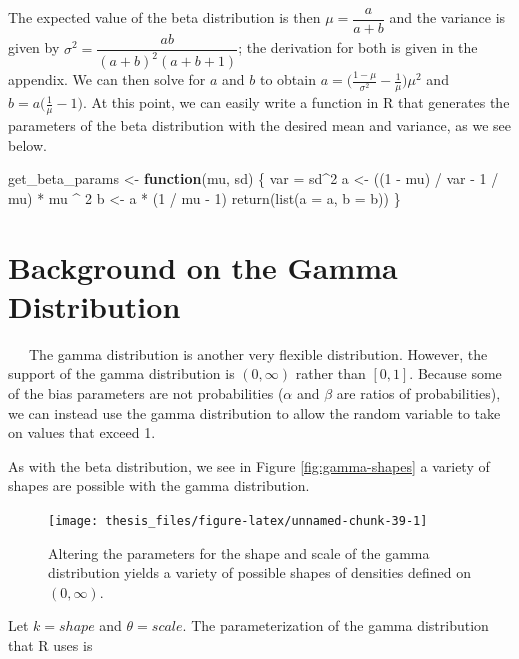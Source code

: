 \documentclass[12pt,twoside]{smiththesis}
\newenvironment{Shaded}{\begin{snugshade}}{\end{snugshade}}
\newcommand{\AttributeTok}[1]{\textcolor[rgb]{0.77,0.63,0.00}{#1}}
\newcommand{\ControlFlowTok}[1]{\textcolor[rgb]{0.13,0.29,0.53}{\textbf{#1}}}
\newcommand{\DecValTok}[1]{\textcolor[rgb]{0.00,0.00,0.81}{#1}}
\newcommand{\FunctionTok}[1]{\textcolor[rgb]{0.00,0.00,0.00}{#1}}
\newcommand{\NormalTok}[1]{#1}
\newcommand{\OtherTok}[1]{\textcolor[rgb]{0.56,0.35,0.01}{#1}}
\newcommand{\SpecialCharTok}[1]{\textcolor[rgb]{0.00,0.00,0.00}{#1}}
\begin{document}
The expected value of the beta distribution is then \(\mu= \dfrac{a}{a + b}\) and the variance is given by \(\sigma^2 = \dfrac{a b}{(a + b)^2(a +b + 1)}\); the derivation for both is given in the appendix. We can then solve for \(a\) and \(b\) to obtain \(a = \Big(\frac{1-\mu}{\sigma^2} - \frac{1}{\mu}\Big) \mu^2\) and \(b = a\Big(\frac{1}{\mu} - 1\Big)\). At this point, we can easily write a function in R that generates the parameters of the beta distribution with the desired mean and variance, as we see below.
\begin{Shaded}
\begin{Highlighting}[]
\NormalTok{get\_beta\_params }\OtherTok{\textless{}{-}} \ControlFlowTok{function}\NormalTok{(mu, sd) \{}
\NormalTok{    var }\OtherTok{=}\NormalTok{ sd}\SpecialCharTok{\^{}}\DecValTok{2}
\NormalTok{    a }\OtherTok{\textless{}{-}}\NormalTok{ ((}\DecValTok{1} \SpecialCharTok{{-}}\NormalTok{ mu) }\SpecialCharTok{/}\NormalTok{ var }\SpecialCharTok{{-}} \DecValTok{1} \SpecialCharTok{/}\NormalTok{ mu) }\SpecialCharTok{*}\NormalTok{ mu }\SpecialCharTok{\^{}} \DecValTok{2}
\NormalTok{    b }\OtherTok{\textless{}{-}}\NormalTok{ a }\SpecialCharTok{*}\NormalTok{ (}\DecValTok{1} \SpecialCharTok{/}\NormalTok{ mu }\SpecialCharTok{{-}} \DecValTok{1}\NormalTok{)}
    \FunctionTok{return}\NormalTok{(}\FunctionTok{list}\NormalTok{(}\AttributeTok{a =}\NormalTok{ a,}
                \AttributeTok{b =}\NormalTok{ b))}
\NormalTok{\}}
\end{Highlighting}
\end{Shaded}
\hypertarget{background-on-the-gamma-distribution}{%
\section{Background on the Gamma Distribution}\label{background-on-the-gamma-distribution}}

~~~The gamma distribution is another very flexible distribution. However, the support of the gamma distribution is \((0,\infty)\) rather than \([0,1]\). Because some of the bias parameters are not probabilities (\(\alpha\) and \(\beta\) are ratios of probabilities), we can instead use the gamma distribution to allow the random variable to take on values that exceed 1.

As with the beta distribution, we see in Figure \ref{fig:gamma-shapes} a variety of shapes are possible with the gamma distribution.
\begin{figure}

{\centering \texttt{[image: thesis\_files/figure-latex/unnamed-chunk-39-1]} 

}

\caption{\label{fig:gamma-shapes}Altering the parameters for the shape and scale of the gamma distribution yields a variety of possible shapes of densities defined on $(0,\infty)$.}\label{fig:unnamed-chunk-39}
\end{figure}
Let \(k=shape\) and \(\theta=scale\). The parameterization of the gamma distribution that R uses is
\end{document}

